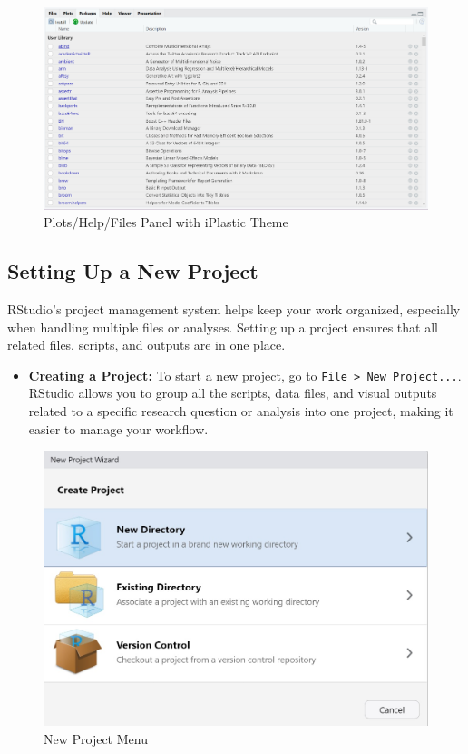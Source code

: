 \documentclass[
]{book}
\providecommand{\tightlist}{%
  \setlength{\itemsep}{0pt}\setlength{\parskip}{0pt}}
\begin{document}
\begin{figure}
\centering
\includegraphics[width=1\textwidth,height=\textheight]{images/files-panel.png}
\caption{Plots/Help/Files Panel with iPlastic Theme}
\end{figure}

\subsection*{Setting Up a New Project}\label{setting-up-a-new-project}

RStudio's project management system helps keep your work organized, especially when handling multiple files or analyses. Setting up a project ensures that all related files, scripts, and outputs are in one place.

\begin{itemize}
\tightlist
\item
  \textbf{Creating a Project:} To start a new project, go to \texttt{File\ \textgreater{}\ New\ Project...}. RStudio allows you to group all the scripts, data files, and visual outputs related to a specific research question or analysis into one project, making it easier to manage your workflow.
\end{itemize}

\begin{figure}
\centering
\includegraphics[width=1\textwidth,height=\textheight]{images/new-project.jpg}
\caption{New Project Menu}
\end{figure}
\end{document}
